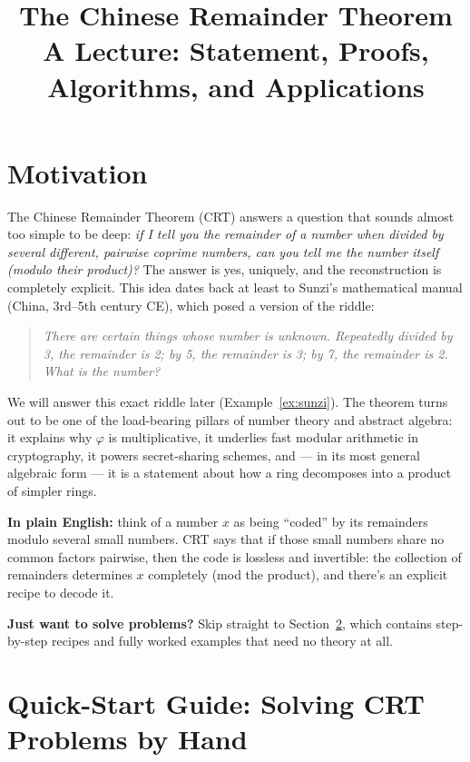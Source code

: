 \documentclass[11pt]{article}
\title{\Large\bfseries The Chinese Remainder Theorem\\[4pt]
\large A Lecture: Statement, Proofs, Algorithms, and Applications}
\author{}
\date{}
\theoremstyle{definition}
\theoremstyle{remark}
\begin{document}
\maketitle
\thispagestyle{fancy}
\tableofcontents

\section{Motivation}

The Chinese Remainder Theorem (CRT) answers a question that sounds almost too simple to be deep: \emph{if I tell you the remainder of a number when divided by several different, pairwise coprime numbers, can you tell me the number itself (modulo their product)?} The answer is yes, uniquely, and the reconstruction is completely explicit. This idea dates back at least to Sunzi's mathematical manual (China, 3rd–5th century CE), which posed a version of the riddle:

\begin{quote}
\emph{There are certain things whose number is unknown. Repeatedly divided by 3, the remainder is 2; by 5, the remainder is 3; by 7, the remainder is 2. What is the number?}
\end{quote}

We will answer this exact riddle later (Example~\ref{ex:sunzi}). The theorem turns out to be one of the load-bearing pillars of number theory and abstract algebra: it explains why $\varphi$ is multiplicative, it underlies fast modular arithmetic in cryptography, it powers secret-sharing schemes, and — in its most general algebraic form — it is a statement about how a ring decomposes into a product of simpler rings.

\noindent\textbf{In plain English:} think of a number $x$ as being ``coded'' by its remainders modulo several small numbers. CRT says that if those small numbers share no common factors pairwise, then the code is lossless and invertible: the collection of remainders determines $x$ completely (mod the product), and there's an explicit recipe to decode it.

\noindent\textbf{Just want to solve problems?} Skip straight to Section~\ref{sec:quickstart}, which contains step-by-step recipes and fully worked examples that need no theory at all.

\section{Quick-Start Guide: Solving CRT Problems by Hand}\label{sec:quickstart}
\end{document}
